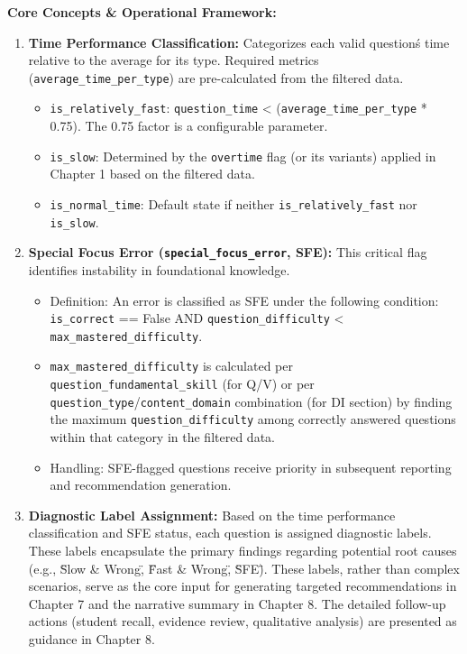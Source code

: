 \documentclass{article}
\begin{document}
\textbf{Core Concepts \& Operational Framework:}
\begin{enumerate}
    \item \textbf{Time Performance Classification:} Categorizes each valid question\'s time relative to the average for its type. Required metrics (\texttt{average\_time\_per\_type}) are pre-calculated from the filtered data.
    \begin{itemize}
        \item \texttt{is\_relatively\_fast}: \texttt{question\_time} < (\texttt{average\_time\_per\_type} * 0.75). The 0.75 factor is a configurable parameter.
        \item \texttt{is\_slow}: Determined by the \texttt{overtime} flag (or its variants) applied in Chapter 1 based on the filtered data.
        \item \texttt{is\_normal\_time}: Default state if neither \texttt{is\_relatively\_fast} nor \texttt{is\_slow}.
    \end{itemize}
    \item \textbf{Special Focus Error (\texttt{special\_focus\_error}, SFE):} This critical flag identifies instability in foundational knowledge.
    \begin{itemize}
        \item Definition: An error is classified as SFE under the following condition:
        \texttt{is\_correct} == False AND \texttt{question\_difficulty} < \texttt{max\_mastered\_difficulty}.
        \item \texttt{max\_mastered\_difficulty} is calculated per \texttt{question\_fundamental\_skill} (for Q/V) or per \texttt{question\_type}/\texttt{content\_domain} combination (for DI section) by finding the maximum \texttt{question\_difficulty} among correctly answered questions within that category in the filtered data.
        \item Handling: SFE-flagged questions receive priority in subsequent reporting and recommendation generation.
    \end{itemize}
    \item \textbf{Diagnostic Label Assignment:} Based on the time performance classification and SFE status, each question is assigned diagnostic labels. These labels encapsulate the primary findings regarding potential root causes (e.g., \"Slow \& Wrong\", \"Fast \& Wrong\", \"SFE\"). These labels, rather than complex scenarios, serve as the core input for generating targeted recommendations in Chapter 7 and the narrative summary in Chapter 8. The detailed follow-up actions (student recall, evidence review, qualitative analysis) are presented as guidance in Chapter 8.
\end{enumerate}
\end{document}

